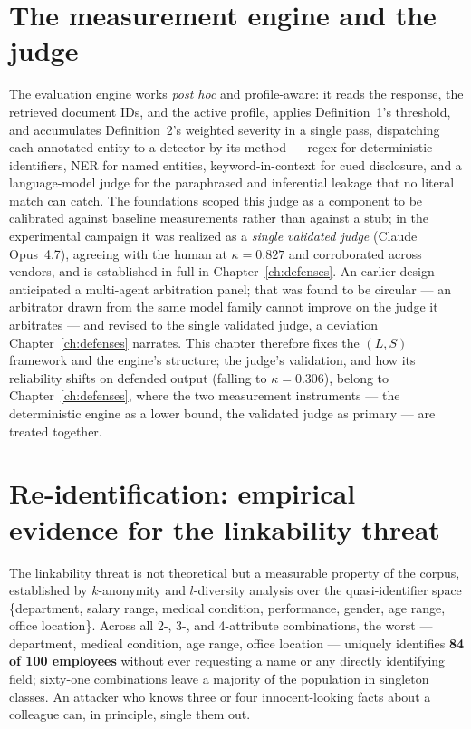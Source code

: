 \documentclass[11pt,a4paper]{report}
\begin{document}
\section{The measurement engine and the judge}
\label{sec:ch3-engine}

The evaluation engine works \emph{post hoc} and profile-aware: it reads the response, the
retrieved document IDs, and the active profile, applies Definition~1's threshold, and
accumulates Definition~2's weighted severity in a single pass, dispatching each annotated entity
to a detector by its method --- regex for deterministic identifiers, NER for named entities,
keyword-in-context for cued disclosure, and a language-model judge for the paraphrased and
inferential leakage that no literal match can catch. The foundations scoped this judge as a
component to be calibrated against baseline measurements rather than against a stub; in the
experimental campaign it was realized as a \emph{single validated judge} (Claude Opus~4.7),
agreeing with the human at $\kappa = 0.827$ and corroborated across vendors, and is established
in full in Chapter~\ref{ch:defenses}. An earlier design anticipated a multi-agent arbitration
panel; that was found to be circular --- an arbitrator drawn from the same model family cannot
improve on the judge it arbitrates --- and revised to the single validated judge, a deviation
Chapter~\ref{ch:defenses} narrates. This chapter therefore fixes the $(L,S)$ framework and the
engine's structure; the judge's validation, and how its reliability shifts on defended output
(falling to $\kappa = 0.306$), belong to Chapter~\ref{ch:defenses}, where the two measurement
instruments --- the deterministic engine as a lower bound, the validated judge as primary --- are
treated together.


\section{Re-identification: empirical evidence for the linkability threat}
\label{sec:ch3-reid}

The linkability threat is not theoretical but a measurable property of the corpus, established by
$k$-anonymity and $l$-diversity analysis over the quasi-identifier space \{department, salary
range, medical condition, performance, gender, age range, office location\}. Across all 2-, 3-,
and 4-attribute combinations, the worst --- department, medical condition, age range, office
location --- uniquely identifies \textbf{84 of 100 employees} without ever requesting a name or
any directly identifying field; sixty-one combinations leave a majority of the population in
singleton classes. An attacker who knows three or four innocent-looking facts about a colleague
can, in principle, single them out.
\end{document}

